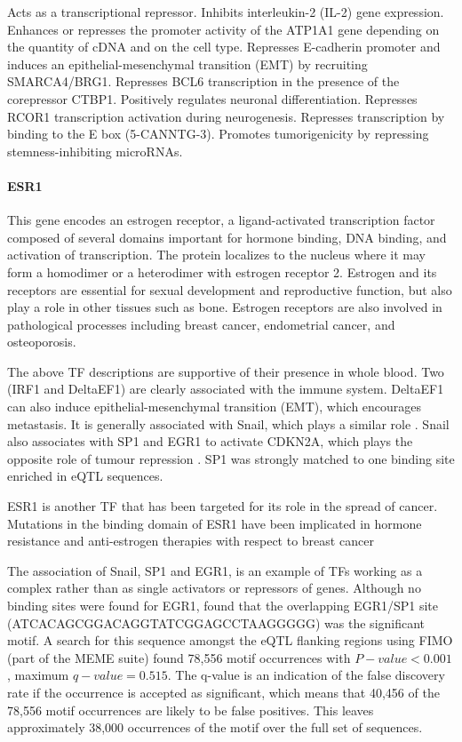 \documentclass[12pt]{article}
\begin{document}
Acts as a transcriptional repressor. Inhibits interleukin-2 (IL-2) gene expression. Enhances or represses the promoter activity of the ATP1A1 gene depending on the quantity of cDNA and on the cell type. Represses E-cadherin promoter and induces an epithelial-mesenchymal transition (EMT) by recruiting SMARCA4/BRG1. Represses BCL6 transcription in the presence of the corepressor CTBP1. Positively regulates neuronal differentiation. Represses RCOR1 transcription activation during neurogenesis. Represses transcription by binding to the E box (5-CANNTG-3). Promotes tumorigenicity by repressing stemness-inhibiting microRNAs.


\paragraph{ESR1}

This gene encodes an estrogen receptor, a ligand-activated transcription factor composed of several domains important for hormone binding, DNA binding, and activation of transcription. The protein localizes to the nucleus where it may form a homodimer or a heterodimer with estrogen receptor 2. Estrogen and its receptors are essential for sexual development and reproductive function, but also play a role in other tissues such as bone. Estrogen receptors are also involved in pathological processes including breast cancer, endometrial cancer, and osteoporosis.

The above TF descriptions are supportive of their presence in whole blood. Two (IRF1 and DeltaEF1) are clearly associated with the immune system. DeltaEF1 can also induce epithelial-mesenchymal transition (EMT), which encourages metastasis. It is generally associated with Snail, which plays a similar role \citep{Bourcy2018}. Snail also associates with SP1 and EGR1 to activate CDKN2A, which plays the opposite role of tumour repression \citep{Hu2010}. SP1 was strongly matched to one binding site enriched in eQTL sequences.

ESR1 is another TF that has been targeted for its role in the spread of cancer. Mutations in the binding domain of ESR1 have been implicated in hormone resistance and anti-estrogen therapies with respect to breast cancer \citep{Griffith2017}

The association of Snail, SP1 and EGR1, is an example of TFs working as a complex rather than as single activators or repressors of genes. Although no binding sites were found for EGR1, \citet{Hu2010} found that the overlapping EGR1/SP1 site (ATCACAGCGGACAGGTATCGGAGCCTAAGGGGG) was the significant motif. A search for this sequence amongst the eQTL flanking regions using FIMO (part of the MEME suite) \citep{Grant2011} found 78,556 motif occurrences with  $P-value < 0.001$, maximum $q-value = 0.515$. The q-value is an indication of the false discovery rate if the occurrence is accepted as significant, which means that 40,456 of the 78,556 motif occurrences are likely to be false positives. This leaves approximately 38,000 occurrences of the motif over the full set of sequences.
\end{document}
